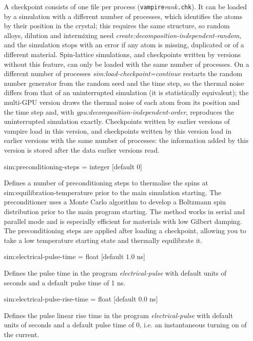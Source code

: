 A checkpoint consists of one file per process (\texttt{vampire}\textit{rank}\texttt{.chk}). It can be loaded by a simulation with a different number of processes, which identifies the atoms by their position in the crystal; this requires the same structure, so random alloys, dilution and intermixing need \textit{create:decomposition-independent-random}, and the simulation stops with an error if any atom is missing, duplicated or of a different material. Spin-lattice simulations, and checkpoints written by versions without this feature, can only be loaded with the same number of processes. On a different number of processes \textit{sim:load-checkpoint=continue} restarts the random number generator from the random seed and the time step, so the thermal noise differs from that of an uninterrupted simulation (it is statistically equivalent); the multi-GPU version draws the thermal noise of each atom from its position and the time step and, with \textit{gpu:decomposition-independent-order}, reproduces the uninterrupted simulation exactly. Checkpoints written by earlier versions of vampire load in this version, and checkpoints written by this version load in earlier versions with the same number of processes: the information added by this version is stored after the data earlier versions read.

{\zicf sim:preconditioning-steps = integer [default 0]} Defines a number of preconditioning steps to thermalise the spins at sim:equilibration-temperature prior to the main simulation starting. The preconditioner uses a Monte Carlo algorithm to develop a Boltzmann spin distribution prior to the main program starting. The method works in serial and parallel mode and is especially efficient for materials with low Gilbert damping. The preconditioning steps are applied after loading a checkpoint, allowing you to take a low temperature starting state and thermally equilibrate it.

{\zicf sim:electrical-pulse-time = float [default $1.0$ ns]}
Defines the pulse time in the program \textit{electrical-pulse} with default
units of seconds and a default pulse time of 1 ns.

{\zicf sim:electrical-pulse-rise-time = float [default $0.0$ ns]}
Defines the pulse linear rise time in the program \textit{electrical-pulse} with
 default units of seconds and a default pulse time of 0, i.e. an instantaneous
 turning on of the current.

